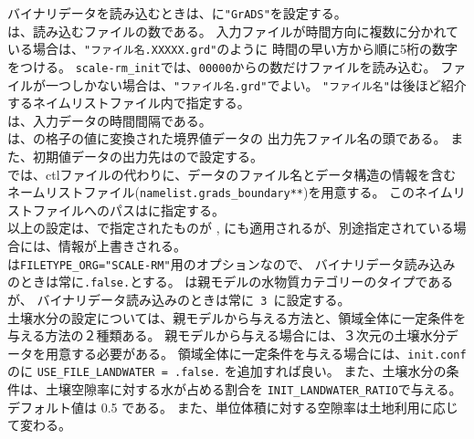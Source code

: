 バイナリデータを読み込むときは、に\verb|"GrADS"|を設定する。\\
は、読み込むファイルの数である。
入力ファイルが時間方向に複数に分かれている場合は、\verb|"ファイル名.XXXXX.grd"|のように
時間の早い方から順に5桁の数字をつける。
\verb|scale-rm_init|では、\verb|00000|からの数だけファイルを読み込む。
ファイルが一つしかない場合は、\verb|"ファイル名.grd"|でよい。
\verb|"ファイル名"|は後ほど紹介するネイムリストファイル内で指定する。\\
は、入力データの時間間隔である。\\
は、\scalerm の格子の値に変換された境界値データの
出力先ファイル名の頭である。
また、初期値データの出力先はので設定する。\\
\scalerm では、ctlファイルの代わりに、データのファイル名とデータ構造の情報を含む
ネームリストファイル(\verb|namelist.grads_boundary**|)を用意する。
このネイムリストファイルへのパスはに指定する。\\
以上の設定は、で指定されたものが
, 
にも適用されるが、別途指定されている場合には、情報が上書きされる。\\
%
は\verb|FILETYPE_ORG="SCALE-RM"|用のオプションなので、
バイナリデータ読み込みのときは常に\verb|.false.|とする。
は親モデルの水物質カテゴリーのタイプであるが、
バイナリデータ読み込みのときは常に\verb| 3 |に設定する。\\


土壌水分の設定については、親モデルから与える方法と、領域全体に一定条件を与える方法の２種類ある。
親モデルから与える場合には、３次元の土壌水分データを用意する必要がある。
領域全体に一定条件を与える場合には、\verb|init.conf|のに
\verb|USE_FILE_LANDWATER = .false.| を追加すれば良い。
また、土壌水分の条件は、土壌空隙率に対する水が占める割合を
\verb|INIT_LANDWATER_RATIO|で与える。デフォルト値は 0.5 である。
また、単位体積に対する空隙率は土地利用に応じて変わる。\\

\\


